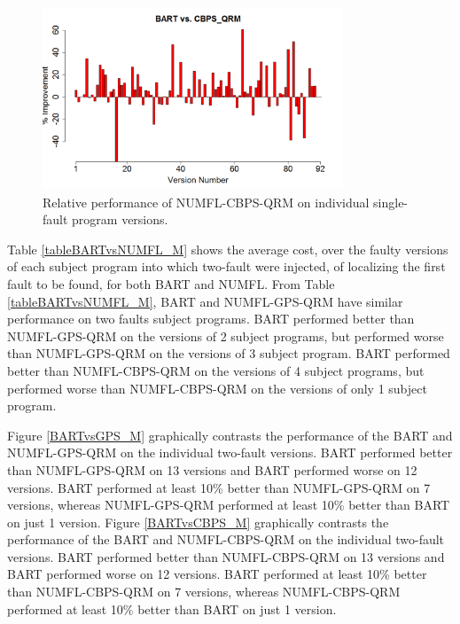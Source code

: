 \begin{figure}[!thpb]
\centering
\includegraphics[width=0.8\textwidth]{chapter4_BARTvsCBPS.pdf}
\caption{Relative performance of NUMFL-CBPS-QRM on individual single-fault program versions.}
\label{BARTvsCBPS}
\end{figure}

Table \ref{tableBARTvsNUMFL_M} shows the average cost, over the faulty versions of each subject program into which two-fault were injected, of localizing the first fault to be found, for both BART and NUMFL.  From Table \ref{tableBARTvsNUMFL_M}, BART and NUMFL-GPS-QRM have similar performance on two faults subject programs. BART performed better than NUMFL-GPS-QRM on the versions of  2 subject programs, but performed worse than NUMFL-GPS-QRM on the versions of 3 subject program.  BART performed better than NUMFL-CBPS-QRM on the versions of 4 subject programs, but performed worse than NUMFL-CBPS-QRM on the versions of only 1 subject program.

Figure \ref{BARTvsGPS_M} graphically contrasts the performance of the BART and NUMFL-GPS-QRM on the individual two-fault versions.  BART performed better than NUMFL-GPS-QRM on 13 versions and BART performed worse on 12 versions.  BART performed at least 10\% better than NUMFL-GPS-QRM on 7 versions, whereas NUMFL-GPS-QRM performed at least 10\% better than BART on just 1 version. Figure \ref{BARTvsCBPS_M} graphically contrasts the performance of the BART and NUMFL-CBPS-QRM on the individual two-fault versions.  BART performed better than NUMFL-CBPS-QRM on 13 versions and BART performed worse on 12 versions.  BART performed at least 10\% better than NUMFL-CBPS-QRM on 7 versions, whereas NUMFL-CBPS-QRM performed at least 10\% better than BART on just 1 version.

